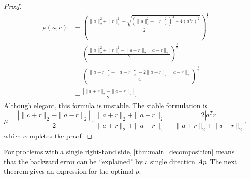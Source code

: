 \documentclass{article}
\newcommand{\ts}{^T}
\begin{document}
\begin{proof}
    \begin{align*}
        \mu(a,r) &= \left(\frac{\|a\|_2^2 + \|r\|_2^2 -\sqrt{(\|a\|_2^2 + \|r\|_2^2)^2 - 4(a\ts r)^2}}{2}\right)^{\frac{1}{2}} \\
        &= \left(\frac{\|a\|_2^2 + \|r\|_2^2 - \|a+r\|_2\|a-r\|_2}{2}\right)^{\frac{1}{2}} \\
        &= \left(\frac{\|a+r\|_2^2 + \|a-r\|_2^2 - 2\|a+r\|_2\|a-r\|_2}{4}\right)^{\frac{1}{2}}\\
        &= \frac{|\|a+r\|_2 - \|a-r\|_2|}{2}.
    \end{align*}
    Although elegant, this formula is unstable. The stable formulation is
    \begin{equation*}
        \mu = \frac{|\|a+r\|_2 - \|a-r\|_2|}{2}\cdot \frac{\|a+r\|_2 + \|a-r\|_2}{\|a+r\|_2+\|a-r\|_2} = \frac{2|a\ts r|}{\|a+r\|_2+\|a-r\|_2},
    \end{equation*}
    which completes the proof.
\end{proof}

For problems with a single right-hand side, \cref{thm:main_decomposition} means that the backward error can be ``explained'' by a single direction $Ap$. The next theorem gives an expression for the optimal $p$. 
\end{document}
